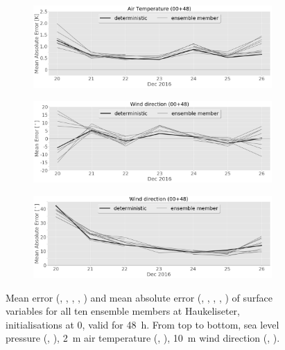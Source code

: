 \begin{figure}[h]
\begin{subfigure}[b]{0.49\textwidth}
		\end{subfigure}
        \begin{subfigure}[b]{0.49\textwidth}
			\includegraphics[width=\textwidth]{./fig_sfc_temp/MAE_20161220_26_00}
			\caption{}\label{fig:MAE:temp}
		\end{subfigure}
		\begin{subfigure}[b]{0.49\textwidth}
			\includegraphics[width=\textwidth]{./fig_sfc_wd/ME_20161220_26_00}
			\caption{}\label{fig:bias:wd}
		\end{subfigure}
        \begin{subfigure}[b]{0.49\textwidth}
			\includegraphics[width=\textwidth]{./fig_sfc_wd/MAE_20161220_26_00}
			\caption{}\label{fig:MAE:wd}
		\end{subfigure}
\caption{Mean error (\protect{}, \protect{}, \protect{}, \protect{}, \protect{}) and mean absolute error (\protect{}, \protect{}, \protect{}, \protect{}, \protect{}) of surface variables for all ten ensemble members at Haukeliseter, initialisations at \SI{0}{\UTC}, valid for \SI{48}{\hour}. From top to bottom, sea level pressure (\protect{}, \protect{}), \SI{2}{\metre} air temperature (\protect{}, \protect{}), \SI{10}{\metre} wind direction (\protect{}, \protect{}).}\label{fig:bias_MAE}
\end{figure}
